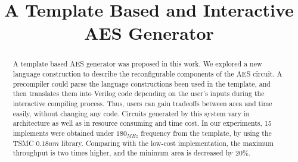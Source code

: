 \documentclass{acm_proc_article-sp}
\begin{document}
\title{A Template Based and Interactive AES Generator}
\maketitle
\begin{abstract}
A template based AES\cite{AES} generator was proposed in this work. We explored a new language construction to describe the reconfigurable components of the AES circuit. A precompiler could parse the language constructions been used in the template, and then translates them into Verilog code depending on the user's inputs during the interactive compiling process. Thus, users can gain tradeoffs between area and time easily, without changing any code. Circuits generated by this system vary in architecture as well as in resource consuming and time cost. In our experiments, 15 implements were obtained under $180_{MHz}$ frequency from the template, by using the TSMC $0.18um$ library. Comparing with the low-cost implementation\cite{Yibo:AES}, the maximum throughput is two times higher, and the minimum area is decreased by $20\%$.
\end{abstract}










\end{document}
